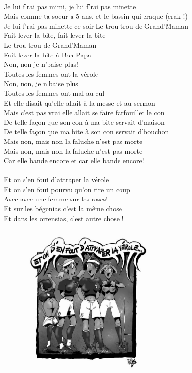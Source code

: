 \\Je lui f'rai pas mimi, je lui f'rai pas minette
\\Mais comme ta soeur a 5 ans, et le bassin qui craque (crak !)
\\Je lui f'rai pas minette ce soir
\breakpage
Le trou-trou de Grand'Maman
\\Fait lever la bite, fait lever la bite
\\Le trou-trou de Grand'Maman
\\Fait lever la bite à Bon Papa
\\Non, non je n'baise plus!
\\Toutes les femmes ont la vérole
\\Non, non, je n'baise plus
\\Toutes les femmes ont mal au cul
\\Et elle disait qu'elle allait à la messe et au sermon
\\Mais c'est pas vrai elle allait se faire farfouiller le con
\\De telle façon que son con à ma bite servait d'maison
\\De telle façon que ma bite à son con servait d'bouchon
\\Mais non, mais non la faluche n'est pas morte
\\Mais non, mais non la faluche n'est pas morte
\\Car elle bande encore et car elle bande encore!
\\\\Et on s'en fout d'attraper la vérole
\\Et on s'en fout pourvu qu'on tire un coup
\\Avec avec une femme sur les roses!
\\Et sur les bégonias c'est la même chose
\\Et dans les ortensias, c'est autre chose !
\begin{figure}[h!]
\centering
   \includegraphics[width=0.60\textwidth]{images/veroles.png}
 \end{figure}

\breakpage
